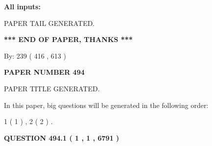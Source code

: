 \documentclass[12pt]{article}
\begin{document}
   
   
   
\noindent{}
   
   
   
   
\noindent\vspace{0.1in}\hspace{-0.08in} {\textbf{\Large{All inputs: }}}
   
   
   
   
   
   
 \vspace{0.2in}
 
   
   
\vspace{2.0in} PAPER TAIL GENERATED.
   
   
   
   
\vspace{1.0in} 
{\textbf{\large{ *** END OF PAPER, THANKS *** }}} 
   
   
\hspace{1.0in} By: 
 239 ( 416 ,  613 )
   
   
   
   
\newpage 
\setcounter{page}{ 
   494001 } 
   
   
   
   
 {\textbf{ \Large{ PAPER NUMBER  494  }}}
   
   
\vspace{0.2in}
   
   
   
   
   
   
   
   
 \vspace{0.2in}
 
 
 
 
   
   
 PAPER TITLE GENERATED.
   
   
   
\vspace{0.2in}
   
In this paper, big questions will be generated in the following order: 
   
   
   1 ( 1 )
 ,
   2 ( 2 )
 .
  
\vspace{0.2in}
  
{\textbf{\Large{QUESTION
494.1 
 ( 1 , 1 , 6791 )
}}}
  
\end{document}
